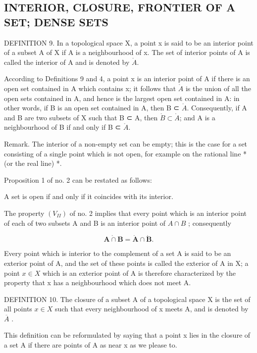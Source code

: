 \subsection{INTERIOR, CLOSURE, FRONTIER OF A SET; DENSE SETS}

DEFINITION 9. In a topological space X, a point x is said to be an interior point of a subset A of X if A is a neighbourhood of x. The set of interior points of A is called the interior of A and is denoted by \(\mathring{A}\).

According to Definitions 9 and 4, a point x is an interior point of A if there is an open set contained in A which contains x; it follows that \(\mathring{A}\) is the union of all the open sets contained in A, and hence is the largest open set contained in A: in other words, if B is an open set contained in A, then B ⊂ \(\mathring{A}\). Consequently, if A and B are two subsets of X such that B ⊂ A, then \(\mathring{B} \subset \mathring{A}\); and A is a neighbourhood of B if and only if B ⊂ \(\mathring{A}\).

Remark. The interior of a non-empty set can be empty; this is the case for a set consisting of a single point which is not open, for example on the rational line * (or the real line) *.

Proposition 1 of no. 2 can be restated as follows:

A set is open if and only if it coincides with its interior.

The property \((V_{II})\) of no. 2 implies that every point which is an interior point of each of two subsets A and B is an interior point of \(A \cap B\) ; consequently

\[
\mathring {\mathbf {A} \cap \mathbf {B}} = \mathring {\mathbf {A}} \cap \mathring {\mathbf {B}}.\tag{1}
\]

Every point which is interior to the complement of a set A is said to be an exterior point of A, and the set of these points is called the exterior of A in X; a point \(x \in X\) which is an exterior point of A is therefore characterized by the property that x has a neighbourhood which does not meet A.

DEFINITION 10. The closure of a subset A of a topological space X is the set of all points \(x \in X\) such that every neighbourhood of x meets A, and is denoted by \(\overline{A}\) .

This definition can be reformulated by saying that a point x lies in the closure of a set A if there are points of A as near x as we please to.

